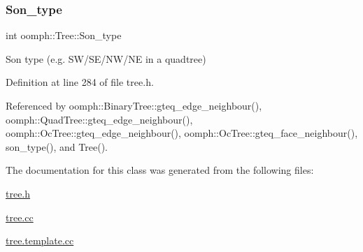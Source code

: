 \subsubsection{\texorpdfstring{Son\+\_\+type}{Son\_type}}
{\footnotesize\ttfamily int oomph\+::\+Tree\+::\+Son\+\_\+type\hspace{0.3cm}{\ttfamily [protected]}}



Son type (e.\+g. S\+W/\+S\+E/\+N\+W/\+NE in a quadtree) 



Definition at line 284 of file tree.\+h.



Referenced by oomph\+::\+Binary\+Tree\+::gteq\+\_\+edge\+\_\+neighbour(), oomph\+::\+Quad\+Tree\+::gteq\+\_\+edge\+\_\+neighbour(), oomph\+::\+Oc\+Tree\+::gteq\+\_\+edge\+\_\+neighbour(), oomph\+::\+Oc\+Tree\+::gteq\+\_\+face\+\_\+neighbour(), son\+\_\+type(), and Tree().



The documentation for this class was generated from the following files\+:\begin{DoxyCompactItemize}
\item 
\hyperlink{tree_8h}{tree.\+h}\item 
\hyperlink{tree_8cc}{tree.\+cc}\item 
\hyperlink{tree_8template_8cc}{tree.\+template.\+cc}\end{DoxyCompactItemize}
